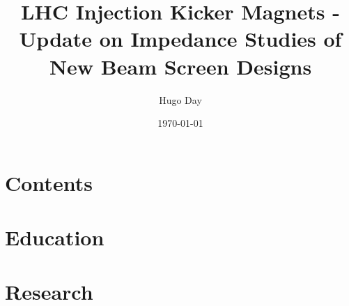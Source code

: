 \documentclass[10pt]{beamer}
\title{LHC Injection Kicker Magnets - Update on Impedance Studies of New Beam Screen Designs} %
\author{Hugo Day} %
\date{\today}
\begin{document}
\frame{\titlepage}


\section{Contents}

\section{Education}

\section{Research}
\end{document}
